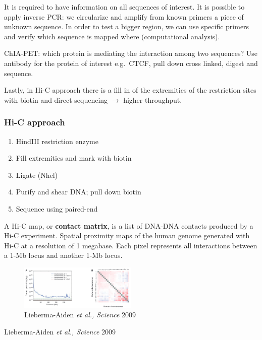 It is required to have information on all sequences of interest. It is possible to apply inverse PCR: we circularize and amplify from known primers a piece of unknown sequence. In order to test a bigger region, we can use specific primers and verify which sequence is mapped where (computational analysis).

ChIA-PET: which protein is mediating the interaction among two sequences? Use antibody for the protein of interest e.g.~CTCF, pull down cross linked, digest and sequence.

Lastly, in Hi-C approach there is a fill in of the extremities of the restriction sites with biotin and direct sequencing $\rightarrow$ higher throughput.

\hypertarget{hi-c-approach}{%
\subsubsection{Hi-C approach}\label{hi-c-approach}}

\begin{enumerate}
\def\labelenumi{\arabic{enumi}.}
\tightlist
\item
  HindIII restriction enzyme
\item
  Fill extremities and mark with biotin
\item
  Ligate (Nhel)
\item
  Purify and shear DNA; pull down biotin
\item
  Sequence using paired-end
\end{enumerate}

A Hi-C map, or \textbf{contact matrix}, is a list of DNA-DNA contacts produced by a Hi-C experiment. Spatial proximity maps of the human genome generated with Hi-C at a resolution of 1 megabase. Each pixel represents all interactions between a 1-Mb locus and another 1-Mb locus.

\begin{figure}
\centering
\includegraphics[width=0.5\textwidth]{../_resources/Screenshot_2022-10-25_at_11-47-30.png}
\caption{Lieberma-Aiden \emph{et al., Science} 2009}
\end{figure}

Lieberma-Aiden \emph{et al., Science} 2009

